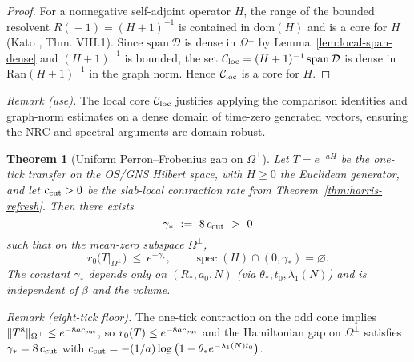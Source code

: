 \documentclass[11pt]{amsart}
\theoremstyle{plain}
\newtheorem{theorem}{Theorem}[section]
\theoremstyle{definition}
\theoremstyle{remark}
\begin{document}
\begin{proof}
For a nonnegative self-adjoint operator $H$, the range of the bounded resolvent $R(\!-1\!)=(H+1)^{-1}$ is contained in $\mathrm{dom}(H)$ and is a core for $H$ (Kato \cite{Kato1995}, Thm. VIII.1). Since $\mathrm{span}\,\mathcal D$ is dense in $\Omega^{\perp}$ by Lemma~\ref{lem:local-span-dense} and $(H+1)^{-1}$ is bounded, the set $\mathcal C_{\rm loc}=(H+1)^{-1}\,\mathrm{span}\,\mathcal D$ is dense in $\mathrm{Ran}(H+1)^{-1}$ in the graph norm. Hence $\mathcal C_{\rm loc}$ is a core for $H$.
\end{proof}
\noindent\emph{Remark (use).} The local core $\mathcal C_{\rm loc}$ justifies applying the comparison identities and graph-norm estimates on a dense domain of time-zero generated vectors, ensuring the NRC and spectral arguments are domain-robust.

\begin{theorem}[Uniform Perron--Frobenius gap on $\Omega^{\perp}$]\label{thm:pf-gap-meanzero}
Let $T=e^{-aH}$ be the one-tick transfer on the OS/GNS Hilbert space, with $H\ge 0$ the Euclidean generator, and let $c_{\rm cut}>0$ be the slab-local contraction rate from Theorem~\ref{thm:harris-refresh}. Then there exists
\[
  \gamma_*\ :=\ 8\,c_{\rm cut}\ >\ 0
\]
such that on the mean-zero subspace $\Omega^{\perp}$,
\[
  r_0\bigl(T|_{\Omega^{\perp}}\bigr)\ \le\ e^{-\gamma_*},\qquad
  \operatorname{spec}(H)\cap(0,\gamma_*)=\varnothing.
\]
The constant $\gamma_*$ depends only on $(R_*,a_0,N)$ (via $\theta_*,t_0,\lambda_1(N)$) and is independent of $\beta$ and the volume.
\end{theorem}
\noindent\emph{Remark (eight-tick floor).} The one-tick contraction on the odd cone implies $\|T^8\|_{\Omega^{\perp}}\le e^{-8 a c_{\rm cut}}$, so $r_0(T)\le e^{-8 a c_{\rm cut}}$ and the Hamiltonian gap on $\Omega^{\perp}$ satisfies $\gamma_* = 8\,c_{\rm cut}$ with $c_{\rm cut}=-(1/a)\log\big(1-\theta_* e^{-\lambda_1(N) t_0}\big)$.
\end{document}
